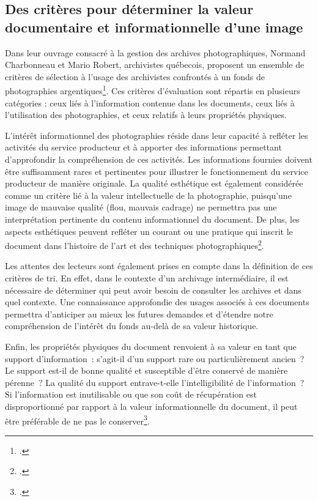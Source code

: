 \subsection*{Des critères pour déterminer la valeur documentaire et informationnelle d'une image}

Dans leur ouvrage consacré à la gestion des archives photographiques, Normand Charbonneau et Mario Robert, archivistes québecois, proposent un ensemble de critères de sélection à l’usage des archivistes confrontés à un fonds de photographies argentiques\footcite[p.55]{charbonneauGestionArchivesPhotographiques2001}. Ces critères d’évaluation sont répartis en plusieurs catégories : ceux liés à l’information contenue dans les documents, ceux liés à l’utilisation des photographies, et ceux relatifs à leurs propriétés physiques.

L’intérêt informationnel des photographies réside dans leur capacité à refléter les activités du service producteur et à apporter des informations permettant d’approfondir la compréhension de ces activités. Les informations fournies doivent être suffisamment rares et pertinentes pour illustrer le fonctionnement du service producteur de manière originale. La qualité esthétique est également considérée comme un critère lié à la valeur intellectuelle de la photographie, puisqu’une image de mauvaise qualité (flou, mauvais cadrage) ne permettra pas une interprétation pertinente du contenu informationnel du document. De plus, les aspects esthétiques peuvent refléter un courant ou une pratique qui inscrit le document dans l’histoire de l’art et des techniques photographiques\footcite[pp.102-103]{charbonneauGestionArchivesPhotographiques2001}. 

Les attentes des lecteurs sont également prises en compte dans la définition de ces critères de tri. En effet, dans le contexte d’un archivage intermédiaire, il est nécessaire de déterminer qui peut avoir besoin de consulter les archives et dans quel contexte. Une connaissance approfondie des usages associés à ces documents permettra d’anticiper au mieux les futures demandes et d'étendre notre compréhension de l’intérêt du fonds au-delà de sa valeur historique. 

Enfin, les propriétés physiques du document renvoient à sa valeur en tant que support d’information : s’agit-il d’un support rare ou particulièrement ancien ? Le support est-il de bonne qualité et susceptible d’être conservé de manière pérenne ? La qualité du support entrave-t-elle l’intelligibilité de l’information ? Si l’information est inutilisable ou que son coût de récupération est disproportionné par rapport à la valeur informationnelle du document, il peut être préférable de ne pas le conserver\footcite[pp.53-55]{charbonneauGestionArchivesPhotographiques2001}.

